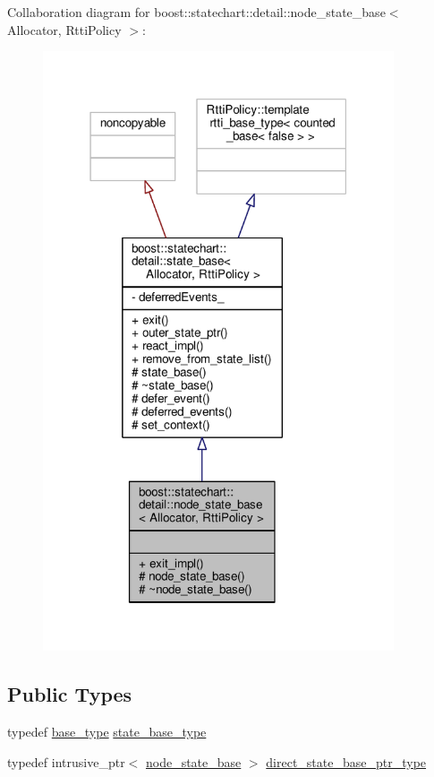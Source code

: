 Collaboration diagram for boost\+:\+:statechart\+:\+:detail\+:\+:node\+\_\+state\+\_\+base$<$ Allocator, Rtti\+Policy $>$\+:
\nopagebreak
\begin{figure}[H]
\begin{center}
\leavevmode
\includegraphics[width=294pt]{classboost_1_1statechart_1_1detail_1_1node__state__base__coll__graph}
\end{center}
\end{figure}
\subsection*{Public Types}
\begin{DoxyCompactItemize}
\item 
typedef \mbox{\hyperlink{classboost_1_1statechart_1_1detail_1_1node__state__base_a6a4897d400d9fb49ee9a7dac1f6c6f58}{base\+\_\+type}} \mbox{\hyperlink{classboost_1_1statechart_1_1detail_1_1node__state__base_a2b7ddb7642a5452045d9448444426735}{state\+\_\+base\+\_\+type}}
\item 
typedef intrusive\+\_\+ptr$<$ \mbox{\hyperlink{classboost_1_1statechart_1_1detail_1_1node__state__base}{node\+\_\+state\+\_\+base}} $>$ \mbox{\hyperlink{classboost_1_1statechart_1_1detail_1_1node__state__base_a52fa5db06246a5d37b5980aa378fa41c}{direct\+\_\+state\+\_\+base\+\_\+ptr\+\_\+type}}
\end{DoxyCompactItemize}

